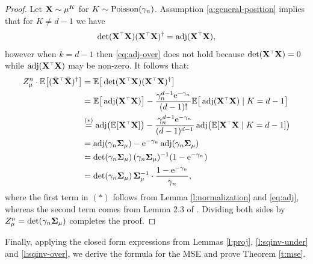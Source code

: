 \documentclass[11pt]{article}
\begin{document}
\begin{proof}
Let $\mathbf X\sim\mu^K$ for $K\sim{\operatorname{Poisson}}(\gamma_n)$. Assumption
\ref{a:general-position} implies that for $K\neq d-1$ we have
\begin{align}
  \det(\X^\top\X)(\X^\top\X)^\dagger=\adj(\X^\top\X),\label{eq:adj-over}
  \end{align}
however when $k=d-1$ then \eqref{eq:adj-over} does not hold because
$\det(\X^\top\X)=0$ while $\adj(\X^\top\X)$ may be non-zero. It 
follows that: 
  \begin{align*}
Z_\mu^n\cdot
    \E\big[ (\Xb^\top\Xb)^{\dagger}\big]
    &=\E\big[\det(\X^\top\X)(\X^\top\X)^\dagger\big]\\
    &=\E\big[\adj(\X^\top\X)\big]-
\frac{\gamma_n^{d-1}\ee^{-\gamma_n}}{(d-1)!}
      \E\big[\adj(\X^\top\X)\mid K=d-1\big]\\
    &\overset{(*)}{=}\adj\!\big(\E[\X^\top\X]\big) -
      \frac{\gamma_n^{d-1}\ee^{-\gamma_n}}{(d-1)^{d-1}}
      \adj\!\big(\E[\X^\top\X\mid K=d-1]\big)\\
    &=\adj(\gamma_n\Sigmab_\mu) - \ee^{-\gamma_n}\adj(\gamma_n\Sigmab_\mu)\\
    &=\det(\gamma_n\Sigmab_\mu)\,(\gamma_n\Sigmab_\mu)^{-1}(1-\ee^{-\gamma_n})\\
    &=\det(\gamma_n\Sigmab_\mu)\,\Sigmab_\mu^{-1}\cdot\frac{1-\ee^{-\gamma_n}}{\gamma_n},
  \end{align*}
  where the first term in $(*)$ follows from Lemma
  \ref{l:normalization} and \eqref{eq:adj}, whereas the second term comes
  from Lemma 2.3 of \cite{correcting-bias-journal}.
Dividing both sides by $Z_\mu^n=\det(\gamma_n\mathbf{\Sigma}_\mu)$ completes the proof.
\end{proof}
Finally, applying the closed form expressions from Lemmas
\ref{l:proj}, \ref{l:sqinv-under} and \ref{l:sqinv-over}, we derive
the formula for the MSE and prove Theorem \ref{t:mse}.
\end{document}
